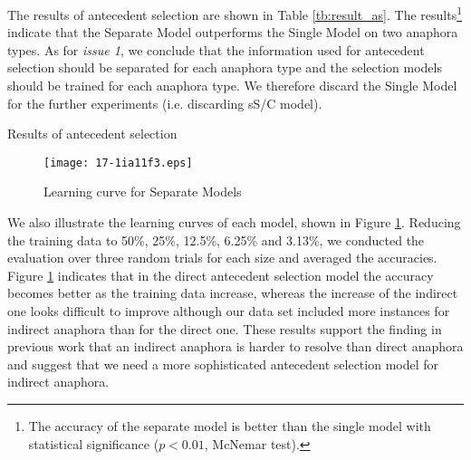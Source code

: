 \documentclass[english]{jnlp_1.4}
\begin{document}
The results of antecedent selection are shown in Table
\ref{tb:result_as}. The results\footnote{The accuracy of the separate
  model is better than the single model with statistical significance
  ($p<0.01$, McNemar test).} indicate that the Separate Model
outperforms the Single Model on two anaphora types. As for \emph{issue
  1}, we conclude that the information used for antecedent selection
should be separated for each anaphora type and the selection models
should be trained for each anaphora type. We therefore discard the
Single Model for the further experiments (i.e. discarding sS/C model).

\begin{table}[b]
\vspace{-0.5\baselineskip}
  \caption{Results of antecedent selection}
 \label{tb:result_as}

\end{table}
\begin{figure}[b]
\vspace{0.5\baselineskip}
\begin{center}
\texttt{[image: 17-1ia11f3.eps]}
\end{center}
\caption{Learning curve for Separate Models} 
\label{fig:learning_curve_as}
\end{figure}

We also illustrate the learning curves of each model, shown in Figure
\ref{fig:learning_curve_as}. Reducing the training data to 50\%, 25\%,
12.5\%, 6.25\% and 3.13\%, we conducted the evaluation over three
random trials for each size and averaged the accuracies. Figure
\ref{fig:learning_curve_as} indicates that in the direct antecedent
selection model the accuracy becomes better as the training data
increase, whereas the increase of the indirect one looks difficult to
improve although our data set included more instances for indirect
anaphora than for the direct one. These results support the finding in
previous work that an indirect anaphora is harder to resolve than
direct anaphora and suggest that we need a more sophisticated
antecedent selection model for indirect anaphora.
\end{document}
